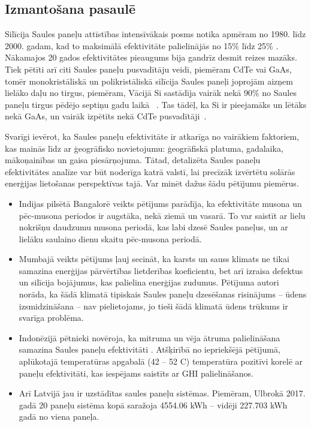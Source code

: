 \subsection{Izmantošana pasaulē}


Silīcija Saules paneļu attīstības intensīvākais posms notika apmēram no 1980. līdz 2000. gadam, kad to maksimālā efektivitāte palielinājās no 15\% līdz 25\%
\cite{Sivaram}. Nākamajos 20 gados efektivitātes pieaugums bija gandrīz desmit reizes mazāks. Tiek pētīti arī citi Saules paneļu pusvadītāju veidi, piemēram CdTe vai GaAs, tomēr monokristāliskā un polikristāliskā silīcija Saules paneļi joprojām aizņem lielāko daļu no tirgus, piemēram, Vācijā Si sastādīja vairāk nekā 90\% no Saules paneļu tirgus pēdējo septiņu gadu laikā ~\cite{prognoze}. Tas tādēļ, ka Si ir pieejamāks un lētāks nekā GaAs\cite{hayes_clemens_2015}, un vairāk izpētīts nekā CdTe pusvadītāji~\cite{Sivaram}.

Svarīgi ievērot, ka Saules paneļu efektivitāte ir atkarīga no vairākiem faktoriem, kas mainās līdz ar ģeogrāfisko novietojumu: ģeogrāfiskā platuma, gadalaika, mākoņainības un gaisa piesārņojuma. Tātad, detalizēta Saules paneļu efektivitātes analīze var būt noderīga katrā valstī, lai precīzāk izvērtētu solārās enerģijas lietošanas perspektīvas tajā. Var minēt dažus šādu pētījumu piemērus.
\begin{itemize}
  \item Indijas pilsētā Bangalorē veikts pētījums \cite{effectCloudsOnSurface} parādīja, ka efektivitāte musona un pēc-musona periodos ir augstāka, nekā ziemā un vasarā. To var saistīt ar lielu nokrišņu daudzumu musona periodā, kas labi dzesē Saules paneļus, un ar lielāku saulaino dienu skaitu pēc-musona periodā.
  \item Mumbajā veikts pētījums \cite{improvePerformance} ļauj secināt, ka karsts un sauss klimats ne tikai samazina enerģijas pārvērtības lietderības koeficientu, bet arī izraisa defektus un silīcija bojājumus, kas palielina enerģijas zudumus. Pētījuma autori norāda, ka šādā klimatā tipiskais Saules paneļu dzesēšanas risinājums -- ūdens izsmidzināšana -- nav pielietojams, jo tieši šādā klimatā ūdens trūkums ir svarīga problēma.
  \item Indonēzijā pētnieki novēroja, ka mitruma un vēja ātruma palielināšana samazina Saules paneļu efektivitāti
  \cite{Sani_2018}. Atšķirībā no iepriekšējā pētījumā, aplūkotajā temperatūras apgabalā (42 -- 52 \textdegree C) temperatūra pozitīvi korelē ar paneļu efektivitāti, kas iespējams saistīts ar GHI palielināšanos. 
  \item Arī Latvijā jau ir uzstādītas saules paneļu sistēmas. Piemēram, Ulbrokā 2017. gadā 20 paneļu sistēma kopā saražoja 4554.06 kWh -- vidēji 227.703 kWh gadā no viena paneļa.
\end{itemize}


